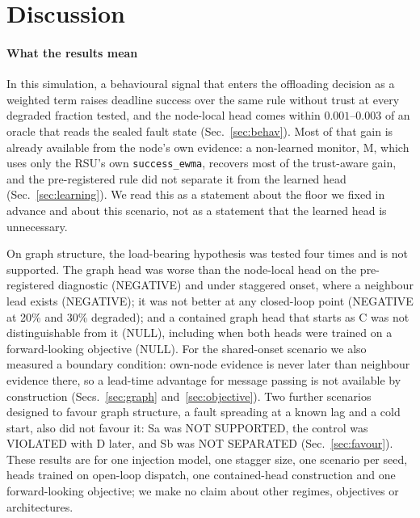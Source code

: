\section{Discussion}
\label{sec:discussion}

\paragraph*{What the results mean}
In this simulation, a behavioural signal that enters the offloading decision as a weighted term raises deadline success over the same rule without trust at every degraded fraction tested, and the node-local head comes within $0.001$--$0.003$ of an oracle that reads the sealed fault state (Sec.~\ref{sec:behav}).
Most of that gain is already available from the node's own evidence: a non-learned monitor, M, which uses only the RSU's own \texttt{success\_ewma}, recovers most of the trust-aware gain, and the pre-registered rule did not separate it from the learned head (Sec.~\ref{sec:learning}).
We read this as a statement about the floor we fixed in advance and about this scenario, not as a statement that the learned head is unnecessary.

On graph structure, the load-bearing hypothesis was tested four times and is not supported.
The graph head was worse than the node-local head on the pre-registered diagnostic (NEGATIVE) and under staggered onset, where a neighbour lead exists (NEGATIVE); it was not better at any closed-loop point (NEGATIVE at 20\% and 30\% degraded); and a contained graph head that starts as C was not distinguishable from it (NULL), including when both heads were trained on a forward-looking objective (NULL).
For the shared-onset scenario we also measured a boundary condition: own-node evidence is never later than neighbour evidence there, so a lead-time advantage for message passing is not available by construction (Secs.~\ref{sec:graph} and~\ref{sec:objective}).
Two further scenarios designed to favour graph structure, a fault spreading at a known lag and a cold start, also did not favour it: Sa was NOT SUPPORTED, the control was VIOLATED with D later, and Sb was NOT SEPARATED (Sec.~\ref{sec:favour}).
These results are for one injection model, one stagger size, one scenario per seed, heads trained on open-loop dispatch, one contained-head construction and one forward-looking objective; we make no claim about other regimes, objectives or architectures.

